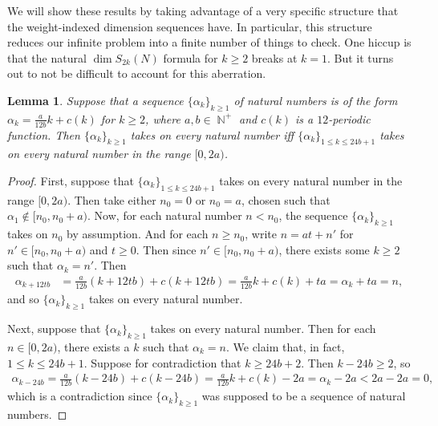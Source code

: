\documentclass[12pt,letterpaper,reqno]{amsart}
\newtheorem{lemma}[theorem]{Lemma}
\theoremstyle{definition}
\numberwithin{equation}{section}
\numberwithin{figure}{section}
\numberwithin{table}{section}
\DeclareMathOperator{\NN}{\mathbb{N}}
\begin{document}
We will show these results by taking advantage of a very specific structure that the weight-indexed dimension sequences have. 
In particular, this structure reduces our infinite problem into a finite number of things to check. 
One hiccup is that the natural $\dim S_{2k}(N)$ formula for $k \ge 2$ breaks at $k=1$. But it turns out to not be difficult to account for this aberration.
\begin{lemma} \label{lemma:k-periodic}
    Suppose that a sequence $\{\alpha_k\}_{k\ge1}$ of natural numbers is of the form $\displaystyle \alpha_k = \frac{a}{12b} k + c(k)$ for $k \ge 2$, where $a,b \in \NN^+$ and $c(k)$ is a $12$-periodic function. Then $\{\alpha_k\}_{k\ge1}$ takes on every natural number iff $\{\alpha_k\}_{1\le k \le 24b+1}$ takes on every natural number in the range $[0,2a)$.
\end{lemma}
\begin{proof}
    First, suppose that $\{\alpha_k\}_{1\le k \le 24b+1}$ takes on every natural number in the range $[0,2a)$. Then take either $n_0 = 0$ or $n_0 = a$, chosen such that $\alpha_1 \notin [n_0,n_0+a)$. Now, for each natural number $n < n_0$, the sequence $\{\alpha_k\}_{k\ge1}$ takes on $n_0$ by assumption. And for each $n \ge n_0$, write $n = at+n'$ for $n' \in [n_0,n_0+a)$ and $t \ge 0$. Then since $n' \in [n_0,n_0+a)$, there exists some $k \ge 2$ such that $\alpha_k = n'$. Then
    \begin{align}
        \alpha_{k+12tb} &= \frac{a}{12b}(k+12tb) + c(k+12tb) 
        = \frac{a}{12b}k+c(k) +ta 
        = \alpha_k + ta = n,
    \end{align}
    and so $\{\alpha_k\}_{k\ge1}$ takes on every natural number.

    Next, suppose that $\{\alpha_k\}_{k\ge1}$ takes on every natural number. Then for each $n \in [0,2a)$, there exists a $k$ such that $\alpha_k = n$. We claim that, in fact, $1 \le k \le 24b+1$. Suppose for contradiction that $k \ge 24b+2$. Then $k-24b \ge 2$, so
    \begin{align}
        \alpha_{k-24b} = \frac{a}{12b}(k-24b) + c(k-24b)  
        = \frac{a}{12b}k+c(k) - 2a 
        = \alpha_k - 2a < 2a - 2a = 0,
    \end{align}
    which is a contradiction since $\{\alpha_k\}_{k\ge1}$ was supposed to be a sequence of natural numbers.
\end{proof}
\end{document}
